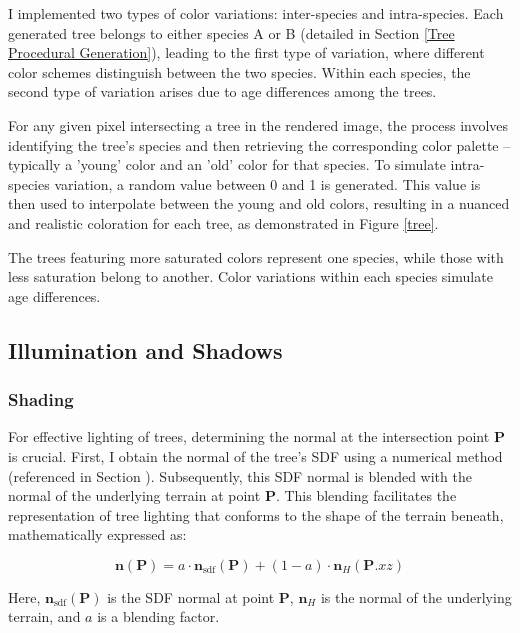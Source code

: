 I implemented two types of color variations: inter-species and intra-species. Each generated tree belongs to either species A or B (detailed in Section \ref{Tree Procedural Generation}), leading to the first type of variation, where different color schemes distinguish between the two species. Within each species, the second type of variation arises due to age differences among the trees. 

For any given pixel intersecting a tree in the rendered image, the process involves identifying the tree's species and then retrieving the corresponding color palette -- typically a 'young' color and an 'old' color for that species. To simulate intra-species variation, a random value between 0 and 1 is generated. This value is then used to interpolate between the young and old colors, resulting in a nuanced and realistic coloration for each tree, as demonstrated in Figure \ref{tree}.

{The trees featuring more saturated colors represent one species, while those with less saturation belong to another. Color variations within each species simulate age differences.}

\subsection{Illumination and Shadows}

\subsubsection{Shading}

For effective lighting of trees, determining the normal at the intersection point $\mathbf{P}$ is crucial. First, I obtain the normal of the tree's SDF using a numerical method (referenced in Section ). Subsequently, this SDF normal is blended with the normal of the underlying terrain at point $\mathbf{P}$. This blending facilitates the representation of tree lighting that conforms to the shape of the terrain beneath, mathematically expressed as:

\begin{equation}
    \mathbf{n}(\mathbf{P}) = a \cdot \mathbf{n}_{\text{sdf}}(\mathbf{P}) + (1 - a) \cdot \mathbf{n}_H(\mathbf{P}.xz)
\end{equation}

Here, $\mathbf{n}_{\text{sdf}}(\mathbf{P})$ is the SDF normal at point $\mathbf{P}$, $\mathbf{n}_H$ is the normal of the underlying terrain, and $a$ is a blending factor.

